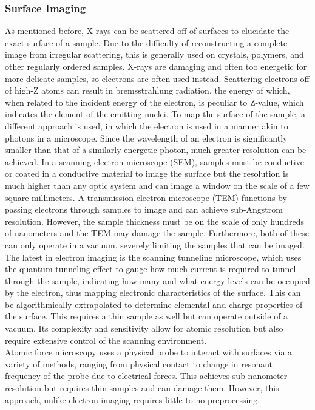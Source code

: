 \subsubsection{Surface Imaging}
As mentioned before, X-rays can be scattered off of surfaces to elucidate the exact surface of a sample. Due to the difficulty of reconstructing a complete image from irregular scattering, this is generally used on crystals, polymers, and other regularly ordered samples. X-rays are damaging and often too energetic for more delicate samples, so electrons are often used instead. Scattering electrons off of high-Z atoms can result in bremsstrahlung radiation, the energy of which, when related to the incident energy of the electron, is peculiar to Z-value, which indicates the element of the emitting nuclei. To map the surface of the sample, a different approach is used, in which the electron is used in a manner akin to photons in a microscope. Since the wavelength of an electron is significantly smaller than that of a similarly energetic photon, much greater resolution can be achieved. In a scanning electron microscope (SEM), samples must be conductive or coated in a conductive material to image the surface but the resolution is much higher than any optic system and can image a window on the scale of a few square millimeters. A transmission electron microscope (TEM) functions by passing electrons through samples to image and can achieve sub-Angstrom resolution. However, the sample thickness must be on the scale of only hundreds of nanometers and the TEM may damage the sample. Furthermore, both of these can only operate in a vacuum, severely limiting the samples that can be imaged. The latest in electron imaging is the scanning tunneling microscope, which uses the quantum tunneling effect to gauge how much current is required to tunnel through the sample, indicating how many and what energy levels can be occupied by the electron, thus mapping electronic characteristics of the surface. This can be algorithmically extrapolated to determine elemental and charge properties of the surface. This requires a thin sample as well but can operate outside of a vacuum. Its complexity and sensitivity allow for atomic resolution but also require extensive control of the scanning environment.\\

Atomic force microscopy uses a physical probe to interact with surfaces via a variety of methods, ranging from physical contact to change in resonant frequency of the probe due to electrical forces. This achieves sub-nanometer resolution but requires thin samples and can damage them. However, this approach, unlike electron imaging requires little to no preprocessing.\\

